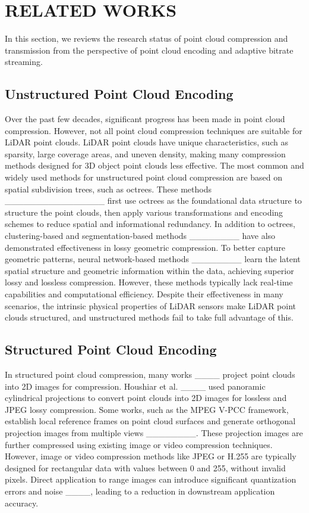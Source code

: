 \section{RELATED WORKS}
In this section, we reviews the research status of point cloud compression and transmission from the perspective of point cloud encoding and adaptive bitrate streaming.
\subsection{Unstructured Point Cloud Encoding}
Over the past few decades, significant progress 
has been made in point cloud compression. 
However, not all point cloud compression techniques 
are suitable for LiDAR point clouds. 
LiDAR point clouds have unique characteristics, 
such as sparsity, large coverage areas, 
and uneven density, making many compression 
methods designed for 3D object point clouds less 
effective. The most common and widely used methods 
for unstructured point cloud compression are based 
on spatial subdivision trees, such as octrees. 
These methods ________________ 
first use octrees as the foundational data 
structure to structure the point clouds, 
then apply various transformations and 
encoding schemes to reduce spatial and 
informational redundancy. 
In addition to octrees, 
clustering-based and segmentation-based
 methods ________ have also 
 demonstrated effectiveness in lossy geometric 
 compression. 
To better capture geometric patterns, 
neural network-based methods ________ learn 
the latent spatial structure and geometric information 
within the data, achieving superior lossy and lossless 
compression. However, these methods typically 
lack real-time capabilities and computational 
efficiency. 
Despite their effectiveness in many scenarios, 
the  intrinsic physical properties of LiDAR sensors make LiDAR 
point clouds structured, 
and unstructured methods fail to 
take full advantage of this.
\subsection{Structured Point Cloud Encoding}
In structured point cloud compression, 
many works ____ project point clouds into 2D images 
for compression. 
Houshiar et al. ____ used panoramic cylindrical 
projections to convert point clouds into 2D images 
for lossless and JPEG lossy compression. 
Some works, such as the MPEG V-PCC framework, 
establish local reference frames on point cloud 
surfaces and generate orthogonal projection images 
from multiple views ________. 
These projection images are further compressed 
using existing image or video compression techniques.
However, image or video compression methods 
like JPEG or H.255 are typically designed 
for rectangular data with values between 0 and 255, 
without invalid pixels. 
Direct application to range images can introduce 
significant quantization errors 
and noise ____,
 leading to a reduction in downstream 
 application accuracy.

